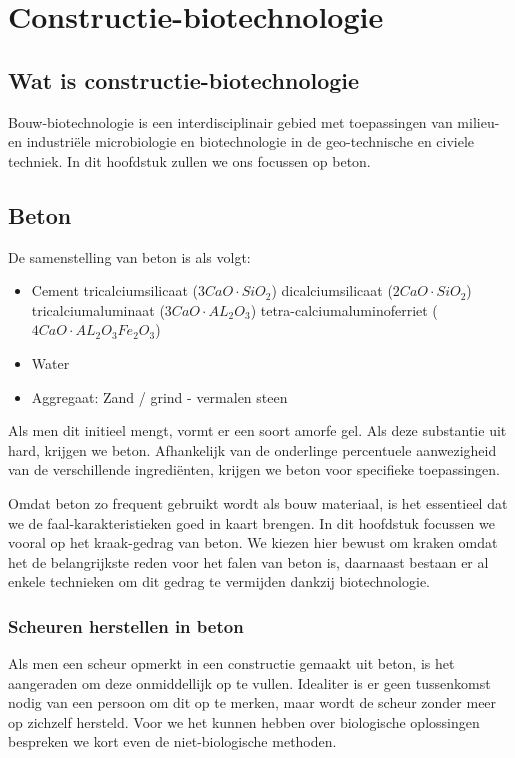 \documentclass[a4paper,kul]{kulakarticle} %
\begin{document}
\section{Constructie-biotechnologie}
\subsection{Wat is constructie-biotechnologie}
Bouw-biotechnologie is een interdisciplinair gebied met toepassingen van milieu- en industriële microbiologie en biotechnologie in de geo-technische en civiele techniek. In dit hoofdstuk zullen we ons focussen op beton.
\subsection{Beton}
De samenstelling van beton is als volgt:
\begin{itemize}
	\item Cement
	\subitem tricalciumsilicaat ($3CaO\cdot SiO_2$)
	\subitem dicalciumsilicaat ($2CaO\cdot SiO_2$)
	\subitem tricalciumaluminaat ($3CaO\cdot AL_2O_3$)
	\subitem tetra-calciumaluminoferriet ($4CaO\cdot AL_2O_3Fe_2O_3$)
	\item Water
	\item Aggregaat: Zand / grind - vermalen steen
\end{itemize}
Als men dit initieel mengt, vormt er een soort amorfe gel. Als deze substantie uit hard, krijgen we beton. Afhankelijk van de onderlinge percentuele aanwezigheid van de verschillende ingrediënten, krijgen we beton voor specifieke toepassingen. 

Omdat beton zo frequent gebruikt wordt als bouw materiaal, is het essentieel dat we de faal-karakteristieken goed in kaart brengen. In dit hoofdstuk focussen we vooral op het kraak-gedrag van beton. We kiezen hier bewust om kraken omdat het de belangrijkste reden voor het falen van beton is, daarnaast bestaan er al enkele technieken om dit gedrag te vermijden dankzij biotechnologie. 
\subsubsection{Scheuren herstellen in beton}
Als men een scheur opmerkt in een constructie gemaakt uit beton, is het aangeraden om deze onmiddellijk op te vullen. Idealiter is er geen tussenkomst nodig van een persoon om dit op te merken, maar wordt de scheur zonder meer op zichzelf hersteld. Voor we het kunnen hebben over biologische oplossingen bespreken we kort even de niet-biologische methoden.
\end{document}
